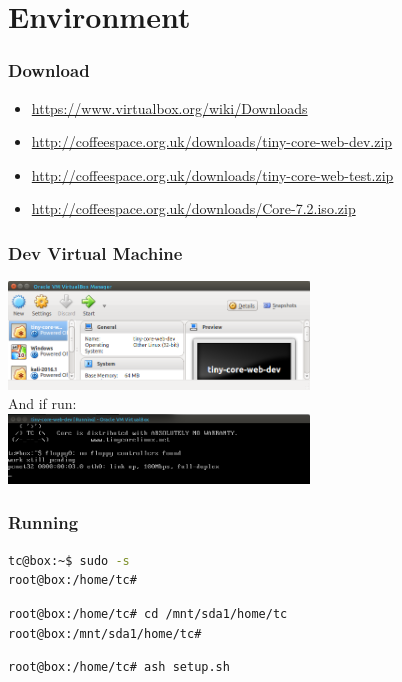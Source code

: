 \documentclass[10pt]{beamer}
\begin{document}
  \section[Env]{Environment}
  \begin{frame}
    \frametitle{Download}
    \begin{itemize}
      \item \url{https://www.virtualbox.org/wiki/Downloads}
      \item \url{http://coffeespace.org.uk/downloads/tiny-core-web-dev.zip}
      \item \url{http://coffeespace.org.uk/downloads/tiny-core-web-test.zip}
      \item \url{http://coffeespace.org.uk/downloads/Core-7.2.iso.zip}
    \end{itemize}
  \end{frame}
  \begin{frame}
    \frametitle{Dev Virtual Machine}
    \centering
    \includegraphics[width=8cm,keepaspectratio]{tiny-core-vm.png}
    \\
    And if run:
    \\
    \includegraphics[width=8cm,keepaspectratio]{tiny-core-run.png}
  \end{frame}
  \begin{frame}[fragile=singleslide]
    \frametitle{Running}
    \centering
    \begin{lstlisting}[caption=Root Access,language=Bash]
tc@box:~$ sudo -s
root@box:/home/tc#
    \end{lstlisting}
    \begin{lstlisting}[caption=Saveable Location,language=Bash]
root@box:/home/tc# cd /mnt/sda1/home/tc
root@box:/mnt/sda1/home/tc#
    \end{lstlisting}
    \begin{lstlisting}[caption=Setup Network,language=Bash]
root@box:/home/tc# ash setup.sh
    \end{lstlisting}
  \end{frame}
\end{document}
